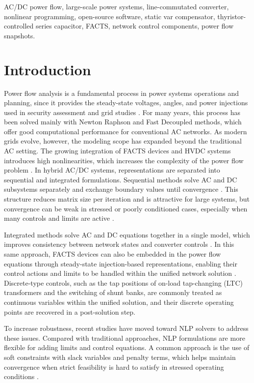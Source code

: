 \documentclass[letterpaper,journal]{IEEEtran}
\begin{document}
\begin{IEEEkeywords}
	AC/DC power flow, large-scale power systems, line-commutated converter, nonlinear programming, 
	open-source software, static var compensator, thyristor-controlled series capacitor, FACTS,
	network control components, power flow snapshots.
\end{IEEEkeywords}

\section{Introduction}


Power flow analysis is a fundamental process in power systems operations and planning, since it provides the steady-state voltages,
angles, and power injections used in security assessment and grid studies \cite{ref1}. For many years, this process has been solved mainly
with Newton Raphson and Fast Decoupled methods, which offer good computational performance for conventional AC networks. As modern grids evolve,
however, the modeling scope has expanded beyond the traditional AC setting. The growing integration of FACTS devices and HVDC systems introduces
high nonlinearities, which increases the complexity of the power flow problem \cite{ref2}.
In hybrid AC/DC systems, representations are separated into sequential and integrated formulations. Sequential methods solve AC and DC
subsystems separately and exchange boundary values until convergence \cite{ref3}. This structure reduces matrix size per iteration and is
attractive for large systems, but convergence can be weak in stressed or poorly conditioned cases, especially when many controls and limits
are active \cite{ref4}.

Integrated methods solve AC and DC equations together in a single model, which improves consistency between network states and converter
controls \cite{ref5}. In this same approach, FACTS devices can also be embedded in the power flow equations through steady-state
injection-based representations, enabling their control actions and limits to be handled within the unified network solution \cite{ref6}.
Discrete-type controls, such as the tap positions of on-load tap-changing (LTC) transformers and the switching of shunt banks, are commonly
treated as continuous variables within the unified solution, and their discrete operating points are recovered in a post-solution step.

To increase robustness, recent studies have moved toward NLP solvers to address these issues. Compared with traditional approaches,
NLP formulations are more flexible for adding limits and control equations. A common approach is the use of soft constraints with
slack variables and penalty terms, which helps maintain convergence when strict feasibility is hard to satisfy in stressed operating
conditions \cite{ref7}.
\end{document}

